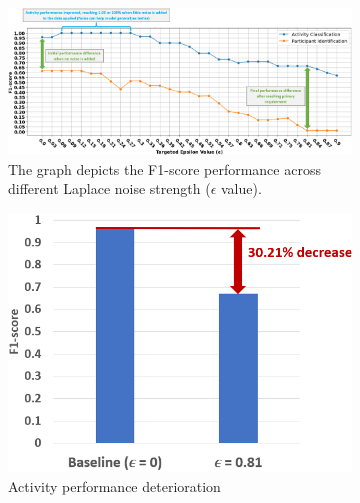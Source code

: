 \documentclass{l4proj}
\begin{document}
\begin{figure}[h]
    \centering
    \begin{subfigure}{1\textwidth}
    \includegraphics[width=\textwidth]{images/privacy-preservation-epsilon-evaluation-method2-f1-scores-topk1000-performance-difference.png}
    \caption{The graph depicts the F1-score performance across different Laplace noise strength ($\epsilon$ value).}
    \label{fig:privacy-preservation-epsilon-evaluation-method2-f1-scores-topk1000-performance-difference}
    \end{subfigure}
    \hfill
    \begin{subfigure}{0.35\textwidth}
    \includegraphics[width=\textwidth]{images/privacy-preservation-difference-comparison-method2-activity-f1-scores.png}
    \caption{Activity performance deterioration}
    \label{fig:privacy-preservation-difference-comparison-method2-activity-f1-scores}
    \end{subfigure}
    \qquad
    \begin{subfigure}{0.35\textwidth}

\end{subfigure}
\end{figure}
\end{document}

